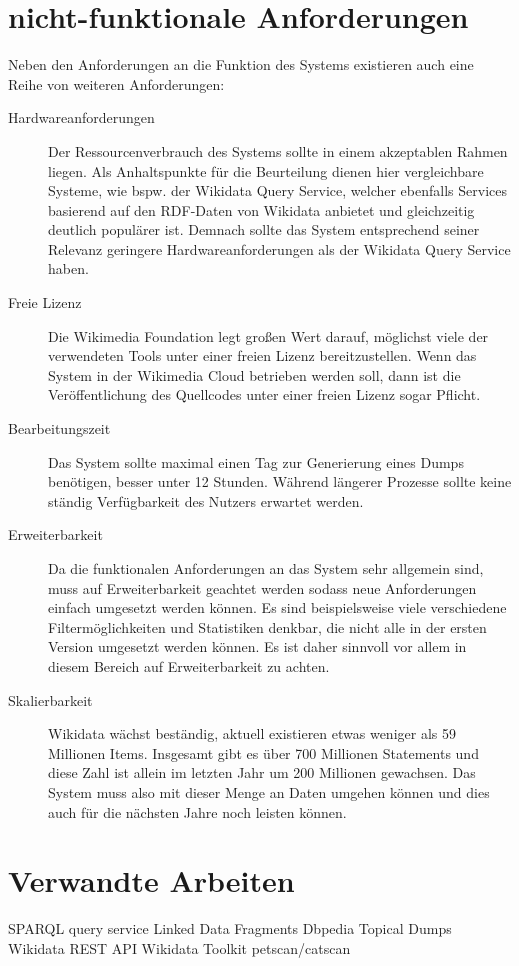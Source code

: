 \section{nicht-funktionale Anforderungen}
Neben den Anforderungen an die Funktion des Systems existieren auch eine Reihe von weiteren Anforderungen:

\begin{description}
  \item[Hardwareanforderungen] Der Ressourcenverbrauch des Systems sollte in einem akzeptablen Rahmen liegen.
  Als Anhaltspunkte für die Beurteilung dienen hier vergleichbare Systeme, wie bspw. der Wikidata Query Service, welcher ebenfalls Services basierend auf den RDF-Daten von Wikidata anbietet und gleichzeitig deutlich populärer ist. Demnach sollte das System entsprechend seiner Relevanz geringere Hardwareanforderungen als der Wikidata Query Service haben.
\item[Freie Lizenz] Die Wikimedia Foundation legt großen Wert darauf, möglichst viele der verwendeten Tools unter einer freien Lizenz bereitzustellen\cite{wikimedia-guiding-principles}.
  Wenn das System in der Wikimedia Cloud betrieben werden soll, dann ist die Veröffentlichung des Quellcodes unter einer freien Lizenz sogar Pflicht\cite{wikimedia-cloud-tos}.
\item[Bearbeitungszeit] Das System sollte maximal einen Tag zur Generierung eines Dumps benötigen, besser unter 12 Stunden. Während längerer Prozesse sollte keine ständig Verfügbarkeit des Nutzers erwartet werden. 
\item[Erweiterbarkeit] Da die funktionalen Anforderungen an das System sehr allgemein sind, muss auf Erweiterbarkeit geachtet werden sodass neue Anforderungen einfach umgesetzt werden können. Es sind beispielsweise viele verschiedene Filtermöglichkeiten und Statistiken denkbar, die nicht alle in der ersten Version umgesetzt werden können. Es ist daher sinnvoll vor allem in diesem Bereich auf Erweiterbarkeit zu achten.
\item[Skalierbarkeit] Wikidata wächst beständig, aktuell existieren etwas weniger als 59 Millionen Items.
  Insgesamt gibt es über 700 Millionen Statements und diese Zahl ist allein im letzten Jahr um 200 Millionen gewachsen. Das System muss also mit dieser Menge an Daten umgehen können und dies auch für die nächsten Jahre noch leisten können.
\end{description}

\section{Verwandte Arbeiten}
 
SPARQL query service
Linked Data Fragments
Dbpedia Topical Dumps
Wikidata REST API
Wikidata Toolkit
petscan/catscan